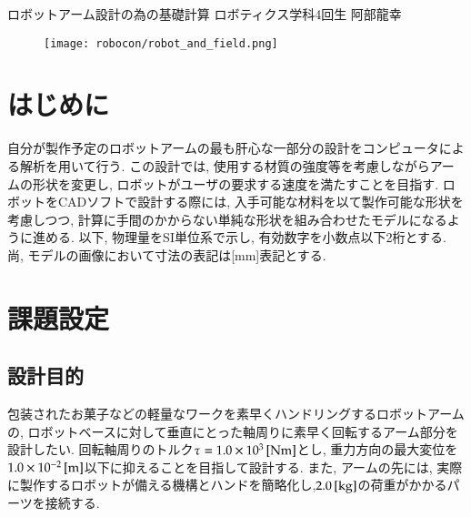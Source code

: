 \documentclass[10pt,b5paper,papersize,dvipdfmx]{jsbook}
\begin{document}


\kaishititle%
  {ロボットアーム設計の為の基礎計算}%
  {ロボティクス学科4回生}%
  {阿部龍幸}%

\begin{figure}[htbp]
  \centering
  \texttt{[image: robocon/robot\_and\_field.png]}
\end{figure}

%
\section*{はじめに}
自分が製作予定のロボットアームの最も肝心な一部分の設計をコンピュータによる解析を用いて行う. この設計では, 使用する材質の強度等を考慮しながらアームの形状を変更し, ロボットがユーザの要求する速度を満たすことを目指す. ロボットをCADソフトで設計する際には, 入手可能な材料を以て製作可能な形状を考慮しつつ, 計算に手間のかからない単純な形状を組み合わせたモデルになるように進める. 以下, 物理量をSI単位系で示し, 有効数字を小数点以下2桁とする. 尚, モデルの画像において寸法の表記は[mm]表記とする. 

%
\section{課題設定}
\subsection{設計目的}
包装されたお菓子などの軽量なワークを素早くハンドリングするロボットアームの, ロボットベースに対して垂直にとった軸周りに素早く回転するアーム部分を設計したい. 回転軸周りのトルク$\tau =1.0 \times 10^3 \tani*{Nm}$とし, 重力方向の最大変位を$1.0 \times 10^{-2} \tani*{m}$以下に抑えることを目指して設計する. また, アームの先には, 実際に製作するロボットが備える機構とハンドを簡略化し,$2.0 \tani*{kg}$の荷重がかかるパーツを接続する.
\end{document}
